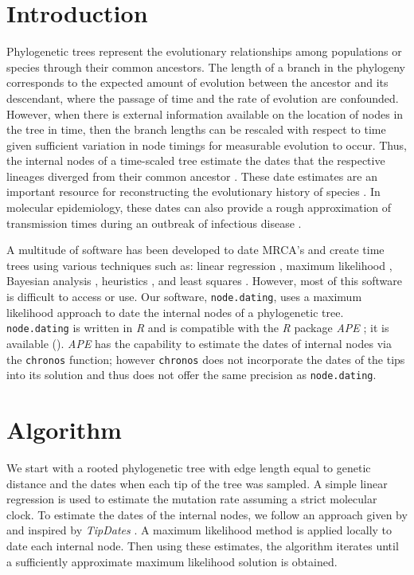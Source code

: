 \documentclass{bioinfo}
\newcommand{\code}[1]{{\tt #1}}
\begin{document}
\section{Introduction} \label{sec:intro}
Phylogenetic trees represent the evolutionary relationships among populations or species through their common ancestors.  
The length of a branch in the phylogeny corresponds to the expected amount of evolution between the ancestor and its descendant, where the passage of time and the rate of evolution are confounded.
However, when there is external information available on the location of nodes in the tree in time, then the branch lengths can be rescaled with respect to time given sufficient variation in node timings for measurable evolution to occur.
Thus, the internal nodes of a time-scaled tree estimate the dates that the respective lineages diverged from their common ancestor \citep{Kumar16}.
These date estimates are an important resource for reconstructing the evolutionary history of species \citep{Shapiro04}.
In molecular epidemiology, these dates can also provide a rough approximation of transmission times during an outbreak of infectious disease \citep{Ypma13}.

A multitude of software has been developed to date MRCA's and create time trees using various techniques such as: linear regression \citep{Tempest}, maximum likelihood \citep{TipDates, r8ts, PAML}, Bayesian analysis \citep{BEAST}, heuristics \citep{UPGMA, TREBLE}, and least squares \citep{LSD}.
However, most of this software is difficult to access or use.
Our software, \code{node.dating}, uses a maximum likelihood approach to date the internal nodes of a phylogenetic tree.
\code{node.dating} is written in \emph{R} and is compatible with the \emph{R} package \emph{APE} \citep{APE}; it is available ().
\emph{APE} has the capability to estimate the dates of internal nodes via the \code{chronos} function; however \code{chronos} does not incorporate the dates of the tips into its solution and thus does not offer the same precision as \code{node.dating}.

\section{Algorithm} \label{sec:alg}
We start with a rooted phylogenetic tree with edge length equal to genetic distance and the dates when each tip of the tree was sampled.
A simple linear regression is used to estimate the mutation rate assuming a strict molecular clock.
To estimate the dates of the internal nodes, we follow an approach given by \cite{Felsenstein81} and inspired by \emph{TipDates} \citep{TipDates}.
A maximum likelihood method is applied locally to date each internal node.
Then using these estimates, the algorithm iterates until a sufficiently approximate maximum likelihood solution is obtained.
\end{document}
